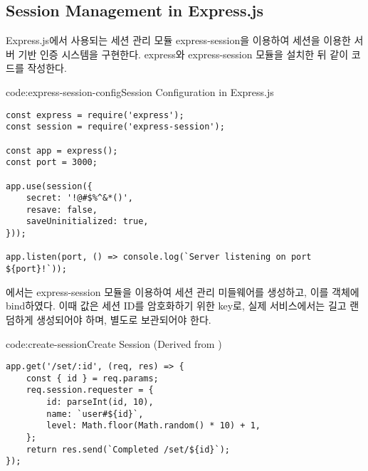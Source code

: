 
\subsection*{Session Management in Express.js}

Express.js에서 사용되는 세션 관리 모듈 express-session을 이용하여 세션을 이용한 서버 기반 인증 시스템을 구현한다. express와 express-session 모듈을 설치한 뒤 \와 같이 코드를 작성한다.

\begin{codeenv}{code:express-session-config}{Session Configuration in Express.js}\begin{verbatim}
const express = require('express');
const session = require('express-session');

const app = express();
const port = 3000;

app.use(session({
    secret: '!@#$%^&*()',
    resave: false,
    saveUninitialized: true,
}));

app.listen(port, () => console.log(`Server listening on port ${port}!`));
\end{verbatim}
\end{codeenv}

에서는 express-session 모듈을 이용하여 세션 관리 미들웨어를 생성하고, 이를  객체에 bind하였다. 이때  값은 세션 ID를 암호화하기 위한 key로, 실제 서비스에서는 길고 랜덤하게 생성되어야 하며, 별도로 보관되어야 한다.

\begin{codeenv}{code:create-session}{Create Session (Derived from )}\begin{verbatim}
app.get('/set/:id', (req, res) => {
    const { id } = req.params;
    req.session.requester = {
        id: parseInt(id, 10),
        name: `user#${id}`,
        level: Math.floor(Math.random() * 10) + 1,
    };
    return res.send(`Completed /set/${id}`);
});
\end{verbatim}
\end{codeenv}

